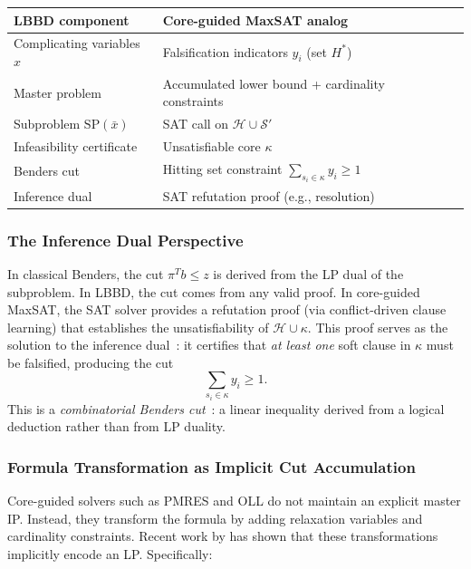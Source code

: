 \begin{center}
\begin{tabular}{lll}
\toprule
\textbf{LBBD component} & \textbf{Core-guided MaxSAT analog} \\
\midrule
Complicating variables $x$ & Falsification indicators $y_i$ (set $H^*$) \\
Master problem & Accumulated lower bound + cardinality constraints \\
Subproblem $\mathrm{SP}(\bar{x})$ & SAT call on $\mathcal{H} \cup \mathcal{S}'$ \\
Infeasibility certificate & Unsatisfiable core $\kappa$ \\
Benders cut & Hitting set constraint $\sum_{s_i \in \kappa} y_i \geq 1$ \\
Inference dual & SAT refutation proof (e.g., resolution) \\
\bottomrule
\end{tabular}
\end{center}

\subsubsection{The Inference Dual Perspective}

In classical Benders, the cut $\pi^T b \leq z$ is derived from the LP dual of
the subproblem. In LBBD, the cut comes from any valid proof. In core-guided
MaxSAT, the SAT solver provides a refutation proof (via conflict-driven clause
learning) that establishes the unsatisfiability of $\mathcal{H} \cup \kappa$.
This proof serves as the solution to the inference dual~\citep{hooker2006duality}: it certifies that
\emph{at least one} soft clause in $\kappa$ must be falsified, producing the
cut
\[
\sum_{s_i \in \kappa} y_i \geq 1.
\]
This is a \emph{combinatorial Benders cut}~\citep{hooker2003logic,codato2006combinatorial}: a linear inequality derived from a logical deduction rather than from LP duality.

\subsubsection{Formula Transformation as Implicit Cut Accumulation}

Core-guided solvers such as PMRES and OLL do not maintain an explicit master
IP. Instead, they transform the formula by adding relaxation variables and
cardinality constraints. Recent work by \citet{katsirelos2023analysis} has
shown that these transformations implicitly encode an LP. Specifically:

